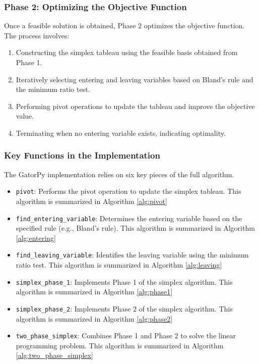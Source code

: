 \documentclass[conference]{IEEEtran}
\begin{document}
\subsubsection{Phase 2: Optimizing the Objective Function}
Once a feasible solution is obtained, Phase 2 optimizes the objective function. The process involves:
\begin{enumerate}
    \item Constructing the simplex tableau using the feasible basis obtained from Phase 1.
    \item Iteratively selecting entering and leaving variables based on Bland's rule and the minimum ratio test.
    \item Performing pivot operations to update the tableau and improve the objective value.
    \item Terminating when no entering variable exists, indicating optimality.
\end{enumerate}

\subsubsection{Key Functions in the Implementation}
The GatorPy implementation relies on six key pieces of the full algorithm.
\begin{itemize}
    \item \texttt{pivot}: Performs the pivot operation to update the simplex tableau.
    This algorithm is summarized in Algorithm \ref{alg:pivot}
    \item \texttt{find\_entering\_variable}: Determines the entering variable based on the specified rule (e.g., Bland's rule).
    This algorithm is summarized in Algorithm \ref{alg:entering}
    \item \texttt{find\_leaving\_variable}: Identifies the leaving variable using the minimum ratio test.
    This algorithm is summarized in Algorithm \ref{alg:leaving}
    \item \texttt{simplex\_phase\_1}: Implements Phase 1 of the simplex algorithm.
    This algorithm is summarized in Algorithm \ref{alg:phase1}
    \item \texttt{simplex\_phase\_2}: Implements Phase 2 of the simplex algorithm.
    This algorithm is summarized in Algorithm \ref{alg:phase2}
    \item \texttt{two\_phase\_simplex}: Combines Phase 1 and Phase 2 to solve the linear programming problem.
    This algorithm is summarized in Algorithm \ref{alg:two_phase_simplex}
\end{itemize}
\end{document}
